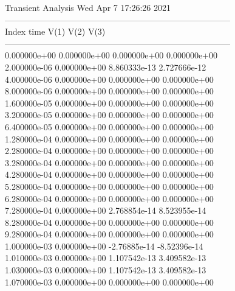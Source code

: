                                   Transient Analysis  Wed Apr  7 17:26:26  2021\\ \hline
--------------------------------------------------------------------------------\\ \hline
Index   time            V(1)            V(2)            V(3)            \\ \hline
--------------------------------------------------------------------------------\\ 	0.000000e+00	0.000000e+00	0.000000e+00	0.000000e+00	\\ 	2.000000e-06	0.000000e+00	8.860333e-13	2.727666e-12	\\ 	4.000000e-06	0.000000e+00	0.000000e+00	0.000000e+00	\\ 	8.000000e-06	0.000000e+00	0.000000e+00	0.000000e+00	\\ 	1.600000e-05	0.000000e+00	0.000000e+00	0.000000e+00	\\ 	3.200000e-05	0.000000e+00	0.000000e+00	0.000000e+00	\\ 	6.400000e-05	0.000000e+00	0.000000e+00	0.000000e+00	\\ 	1.280000e-04	0.000000e+00	0.000000e+00	0.000000e+00	\\ 	2.280000e-04	0.000000e+00	0.000000e+00	0.000000e+00	\\ 	3.280000e-04	0.000000e+00	0.000000e+00	0.000000e+00	\\ 	4.280000e-04	0.000000e+00	0.000000e+00	0.000000e+00	\\ 	5.280000e-04	0.000000e+00	0.000000e+00	0.000000e+00	\\ 	6.280000e-04	0.000000e+00	0.000000e+00	0.000000e+00	\\ 	7.280000e-04	0.000000e+00	2.768854e-14	8.523955e-14	\\ 	8.280000e-04	0.000000e+00	0.000000e+00	0.000000e+00	\\ 	9.280000e-04	0.000000e+00	0.000000e+00	0.000000e+00	\\ 	1.000000e-03	0.000000e+00	-2.76885e-14	-8.52396e-14	\\ 	1.010000e-03	0.000000e+00	1.107542e-13	3.409582e-13	\\ 	1.030000e-03	0.000000e+00	1.107542e-13	3.409582e-13	\\ 	1.070000e-03	0.000000e+00	0.000000e+00	0.000000e+00	\\ \hline
